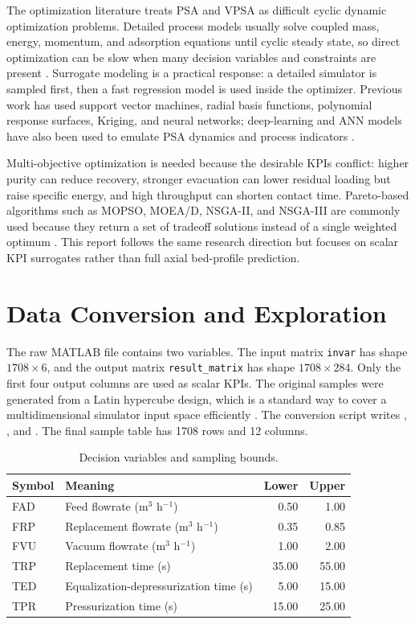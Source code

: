 \documentclass[a4paper,12pt]{article}
\begin{document}
The optimization literature treats PSA and VPSA as difficult cyclic dynamic optimization problems. Detailed process models usually solve coupled mass, energy, momentum, and adsorption equations until cyclic steady state, so direct optimization can be slow when many decision variables and constraints are present \cite{haghpanah2013multiobjective,yan2016dryfluegas}. Surrogate modeling is a practical response: a detailed simulator is sampled first, then a fast regression model is used inside the optimizer. Previous work has used support vector machines, radial basis functions, polynomial response surfaces, Kriging, and neural networks; deep-learning and ANN models have also been used to emulate PSA dynamics and process indicators \cite{oliveira2020deeplearningpsa,wang2022comparative}.

Multi-objective optimization is needed because the desirable KPIs conflict: higher purity can reduce recovery, stronger evacuation can lower residual loading but raise specific energy, and high throughput can shorten contact time. Pareto-based algorithms such as MOPSO, MOEA/D, NSGA-II, and NSGA-III are commonly used because they return a set of tradeoff solutions instead of a single weighted optimum \cite{coello2002mopso,zhang2007moead,deb2002nsga2,deb2014nsga3}. This report follows the same research direction but focuses on scalar KPI surrogates rather than full axial bed-profile prediction.

\section{Data Conversion and Exploration}
The raw MATLAB file contains two variables. The input matrix \texttt{invar} has shape $1708 \times 6$, and the output matrix \texttt{result\_matrix} has shape $1708 \times 284$. Only the first four output columns are used as scalar KPIs. The original samples were generated from a Latin hypercube design, which is a standard way to cover a multidimensional simulator input space efficiently \cite{mckay1979lhs}. The conversion script writes , , and . The final sample table has 1708 rows and 12 columns.

\begin{table}[H]
\centering
\caption{Decision variables and sampling bounds.}
\label{tab:bounds}
\begin{tabular}{llrr}
\toprule
Symbol & Meaning & Lower & Upper \\
\midrule
FAD & Feed flowrate (m$^3$ h$^{-1}$) & 0.50 & 1.00 \\
FRP & Replacement flowrate (m$^3$ h$^{-1}$) & 0.35 & 0.85 \\
FVU & Vacuum flowrate (m$^3$ h$^{-1}$) & 1.00 & 2.00 \\
TRP & Replacement time (s) & 35.00 & 55.00 \\
TED & Equalization-depressurization time (s) & 5.00 & 15.00 \\
TPR & Pressurization time (s) & 15.00 & 25.00 \\
\bottomrule
\end{tabular}
\end{table}
\end{document}
